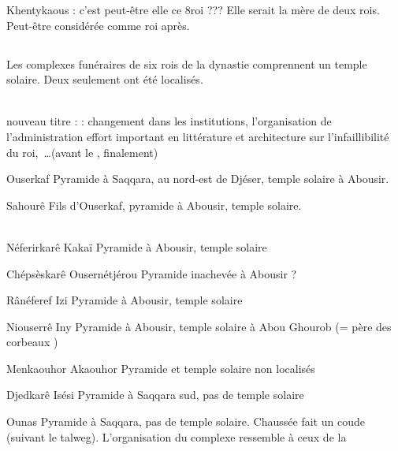 Khentykaous : c'est peut-être elle ce 8\ieme roi ???
Elle serait la mère de deux rois. Peut-être considérée comme roi après.

\subsection{\texorpdfstring{}{Ve dynastie}}

Les complexes funéraires de six rois de la dynastie comprennent un 
temple solaire. Deux seulement ont été localisés.
                  
\noi{} \\
nouveau titre :  : changement 
dans les institutions, l'organisation de l'administration \donc{} 
effort important en littérature et architecture sur l'infaillibilité 
du roi,~\dots (avant le \MK, finalement)

\begin{listerois}
  \item [Ouserkaf] Pyramide à Saqqara, au nord-est de Djéser, 
        temple solaire à Abousir.
  \item [Sahourê] Fils d'Ouserkaf, pyramide à Abousir, temple 
        solaire. \\
         \\
  \item [Néferirkarê Kakaï] Pyramide à Abousir, temple solaire
  \item [Chépsèskarê Ousernétjérou] Pyramide inachevée à Abousir ?
  \item [Rânéferef Izi] Pyramide à Abousir, temple solaire
  \item [Niouserrê Iny] Pyramide à Abousir, temple solaire à 
        Abou Ghourob (= \og père des corbeaux \fg)
  \item [Menkaouhor Akaouhor] Pyramide et temple solaire non localisés
  \item [Djedkarê Isési] Pyramide à Saqqara sud, pas de temple solaire
  \item [Ounas] Pyramide à Saqqara, pas de temple solaire. Chaussée 
        fait un coude (suivant le talweg). L'organisation du complexe 
        ressemble à ceux de la  \\
\end{listerois}

